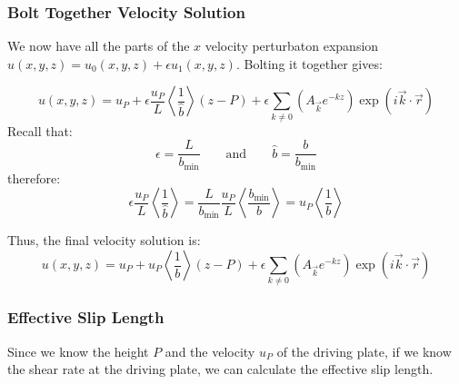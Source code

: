 \documentclass[12pt, a4paper, twoside, openright]{book}
\newcommand{\bmin}{\ensuremath{b_{\mathrm{min}}}}
\begin{document}
\subsubsection*{Bolt Together Velocity Solution}
We now have all the parts of the $x$ velocity perturbaton expansion $u(x,y,z) = u_0(x,y,z) + \epsilon u_1(x,y,z)$.  Bolting it together gives:

\begin{equation}
u(x,y,z) = u_P
 + \epsilon \frac{u_P}{L} \left< \frac{1}{\hat{b}} \right> (z - P)
 +  \epsilon \sum_{k \neq 0} 
\left(  A_{\vec{k}} e^{-kz} \right)
\exp(i \vec{k}\cdot \vec{r})
\end{equation}
Recall that:
\begin{equation}
\epsilon = \frac{L}{\bmin} \qquad \text{and} \qquad
\hat{b} = \frac{b}{\bmin}
\end{equation}
therefore:
\begin{equation}
\epsilon \frac{u_P}{L} \left< \frac{1}{\hat{b}} \right> 
= \frac{L}{\bmin} \frac{u_P}{L} \left< \frac{\bmin}{b} \right> 
= u_P \left< \frac{1}{b} \right>
\end{equation}

Thus, the final velocity solution is:
\begin{equation}
u(x,y,z) = u_P
 + u_P\left< \frac{1}{b} \right> (z - P)
 +  \epsilon \sum_{k \neq 0} 
\left(  A_{\vec{k}} e^{-kz} \right)
\exp(i \vec{k}\cdot \vec{r})
\end{equation}

\subsubsection*{Effective Slip Length}

Since we know the height $P$ and the velocity $u_P$ of the driving plate, if we know the shear rate at the driving plate, we can calculate the effective slip length.
\end{document}
